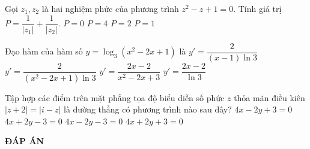 \begin{ex}%
Gọi $z_1, z_2$ là hai nghiệm phức của phương trình $z^2-z+1=0$. Tính giá trị $P=\dfrac{1}{|z_1|}+\dfrac{1}{|z_2|}$.
\choice
{$P=0$}
{$P=4$}
{\True $P=2$}
{$P=1$}
\end{ex}
\begin{ex}%
Đạo hàm của hàm số $y=\log_3(x^2-2x+1)$ là
\choice
{\True $y'=\dfrac{2}{(x-1)\ln 3}$}
{$y'=\dfrac{2}{(x^2-2x+1)\ln 3}$}
{$y'=\dfrac{2x-2}{x^2-2x+3}$}
{$y'=\dfrac{2x-2}{\ln 3}$}
\end{ex}
\begin{ex}%
Tập hợp các điểm trên mặt phẳng tọa độ biểu diễn số phức $z$ thỏa mãn điều kiên $|z+2|=|i-z|$ là đường thẳng có phương trình nào sau đây?
\choice
{$4x-2y+3=0$}
{$4x+2y-3=0$}
{$4x-2y-3=0$}
{\True $4x+2y+3=0$}
\end{ex}
\newpage
\begin{center}
\textbf{ĐÁP ÁN}
\end{center}
\begin{multicols}{10}

\end{multicols}
% 
